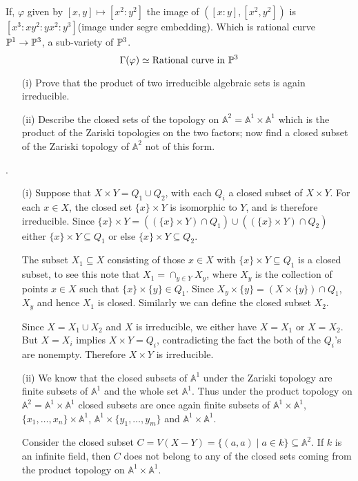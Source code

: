 \documentclass[12pt]{article}
\begin{document}
\vspace*{0.2cm}

\noindent If, $\varphi$ given by $[x,y]\mapsto [x^2:y^2]$ the image of $([x:y],[x^2,y^2])$ is $[x^3:xy^2:yx^2:y^3]$(image under segre embedding). Which is rational curve $\mathbb{P}^1 \to \mathbb{P}^3$, a sub-variety of $\mathbb{P}^3$.
$$\Gamma(\varphi)\simeq \text{Rational curve in }\mathbb{P}^3$$


\begin{prob}
    \begin{enumerate}
        \item[(i)] Prove that the product of two irreducible algebraic sets is again irreducible.
        \item[(ii)] Describe the closed sets of the topology on $\mathbb{A}^2 = \mathbb{A}^1 \times \mathbb{A}^1$ which is the product of the Zariski topologies on the two factors; now find a closed subset of the Zariski topology of $\mathbb{A}^2$ not of this form.
    \end{enumerate}
\end{prob}

\sol.
\begin{enumerate}
    \item[(i)] Suppose that $X \times Y = Q_1 \cup Q_2$, with each $Q_i$ a closed subset of $X \times Y$.
        For each $x \in X$, the closed set $\{x\} \times Y$ is isomorphic to $Y$, and is therefore irreducible.
        Since $\{x\} \times Y= ((\{x\} \times Y) \cap Q_1) \cup ((\{x\} \times Y ) \cap Q_2)$ either $\{x\} \times Y \subseteq Q_1$ or else $\{x\} \times Y \subseteq Q_2$.

        The subset $X_1 \subseteq X$ consisting of those $x \in X$ with $\{x\} \times Y \subseteq Q_1$ is a closed subset, to see this note that $X_1 = \cap_{y \in Y} X_y$, where $X_y$ is the collection of points $x \in X$ such that $\{x\} \times \{y\} \in Q_1$. Since $X_y \times \{y\} = (X \times \{y\}) \cap Q_1$, $X_y$ and hence $X_1$ is closed. Similarly we can define the closed subset $X_2$.

        Since $X = X_1 \cup X_2$ and $X$ is irreducible, we either have $X = X_1$ or $X = X_2$. But $X = X_i$ implies $X \times Y = Q_i$, contradicting the fact the both of the $Q_i$'s are nonempty. Therefore $X \times Y$ is irreducible.

    \item[(ii)] We know that the closed subsets of $\mathbb{A}^1$ under the Zariski topology are finite subsets of $\mathbb{A}^1$ and the whole set $\mathbb{A}^1$. Thus under the product topology on $\mathbb{A}^2 = \mathbb{A}^1 \times \mathbb{A}^1$ closed subsets are once again finite subsets of $\mathbb{A}^1 \times \mathbb{A}^1$, $\{x_1,\dots,x_n\} \times \mathbb{A}^1$, $\mathbb{A}^1 \times \{y_1,\dots,y_m\}$ and $\mathbb{A}^1 \times \mathbb{A}^1$.

        Consider the closed subset $C = V(X-Y) = \{(a,a) \mid a \in k\} \subseteq \mathbb{A}^2$. If $k$ is an infinite field, then $C$ does not belong to any of the closed sets coming from the product topology on $\mathbb{A}^1 \times \mathbb{A}^1$.
\end{enumerate}
\end{document}
